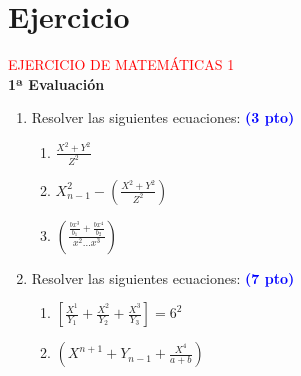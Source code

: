 \documentclass[10pt,a4paper]{article}
\begin{document}
\section{Ejercicio}

\begin{center}
   {\LARGE \textcolor{red}{EJERCICIO DE MATEMÁTICAS 1} } \\
   \vspace{0.8cm}
   {\bf \Large 1ª Evaluación }
\end{center}
\begin{enumerate}
 \item Resolver las siguientes ecuaciones: {\bf\textcolor{blue}{(3 pto)}}
 \begin{enumerate}
  \item $ \frac{X^2+Y^2}{Z^2} $
  \item $ X_{n-1}^2 - \left(\frac{X^2+Y^2}{Z^2}\right) $
  \item $ \left(\frac{\frac{bx^3}{b_1} + \frac{bx^4}{b_2} }
                     {x^2 \ldots x^{3}}
          \right) $
 \end{enumerate}
 \item Resolver las siguientes ecuaciones: {\bf\textcolor{blue}{(7 pto)}}
 \begin{enumerate}
  \item $ \left[ \frac{X^1}{Y_1} + \frac{X^2}{Y_2} + \frac{X^3}{Y_3}
          \right]  = 6^2$
  \item $ \left(
             X^{n+1} + Y_{n-1} + \frac{X^4}{a+b}
          \right) $
 \end{enumerate}
\end{enumerate}
\end{document}

